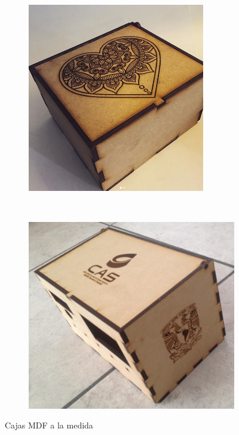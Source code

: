 \documentclass[]{article}
\begin{document}
\begin{figure}[h!]
	\centering
	\begin{subfigure}[b]{0.4\textwidth}
		\includegraphics[width=0.85\textwidth]{AmorAmistad2}
	\end{subfigure}
	~ %
	\begin{subfigure}[b]{0.4\textwidth}	
			\includegraphics[width=1\textwidth]{caseCAS}
	\end{subfigure}
	\caption{Cajas MDF a la medida}
	\label{fig:cajaMDFV2}
\end{figure}
\end{document}
